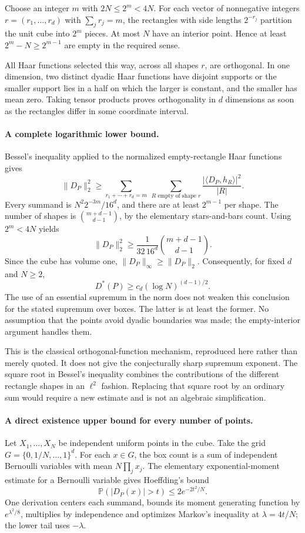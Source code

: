 \documentclass[11pt]{article}
\begin{document}
Choose an integer $m$ with $2N\leq2^m<4N$. For each vector of
nonnegative integers $r=(r_1,\ldots,r_d)$ with $\sum_jr_j=m$,
the rectangles with side lengths $2^{-r_j}$ partition the unit cube
into $2^m$ pieces. At most $N$ have an interior point. Hence at
least $2^m-N\geq2^{m-1}$ are empty in the required sense.

All Haar functions selected this way, across all shapes $r$, are
orthogonal. In one dimension, two distinct dyadic Haar functions
have disjoint supports or the smaller support lies in a half on
which the larger is constant, and the smaller has mean zero.
Taking tensor products proves orthogonality in $d$ dimensions as
soon as the rectangles differ in some coordinate interval.

\paragraph{A complete logarithmic lower bound.}
Bessel's inequality applied to the normalized empty-rectangle Haar
functions gives
\[
 \|D_P\|_2^2
 \geq\sum_{r_1+\cdots+r_d=m}\ \sum_{R\text{ empty of shape }r}
       \frac{|\langle D_P,h_R\rangle|^2}{|R|}.
\]
Every summand is $N^2 2^{-3m}/16^d$, and there are at least
$2^{m-1}$ per shape. The number of shapes is
$\binom{m+d-1}{d-1}$, by the elementary stars-and-bars count.
Using $2^m<4N$ yields
\[
 \|D_P\|_2^2\geq
       \frac1{32\,16^d}\binom{m+d-1}{d-1}.
 \tag{368.3}
\]
Since the cube has volume one, $\|D_P\|_\infty\geq\|D_P\|_2$.
Consequently, for fixed $d$ and $N\geq2$,
\[
 D^*(P)\geq c_d(\log N)^{(d-1)/2}.
 \tag{368.4}
\]
The use of an essential supremum in the norm does not weaken this
conclusion for the stated supremum over boxes. The latter is at
least the former. No assumption that the points avoid dyadic
boundaries was made; the empty-interior argument handles them.

This is the classical orthogonal-function mechanism, reproduced
here rather than merely quoted. It does not give the conjecturally
sharp supremum exponent. The square root in Bessel's inequality
combines the contributions of the different rectangle shapes in
an $\ell^2$ fashion. Replacing that square root by an ordinary sum
would require a new estimate and is not an algebraic simplification.

\paragraph{A direct existence upper bound for every number of points.}
Let $X_1,\ldots,X_N$ be independent uniform points in the cube.
Take the grid $G=\{0,1/N,\ldots,1\}^d$. For each $x\in G$,
the box count is a sum of independent Bernoulli variables with
mean $N\prod_jx_j$. The elementary exponential-moment estimate
for a Bernoulli variable gives Hoeffding's bound
\[
 \mathbb P(|D_P(x)|>t)\leq2e^{-2t^2/N}.
 \tag{368.5}
\]
One derivation centers each summand, bounds its moment generating
function by $e^{\lambda^2/8}$, multiplies by independence and
optimizes Markov's inequality at $\lambda=4t/N$; the lower tail
uses $-\lambda$.
\end{document}
